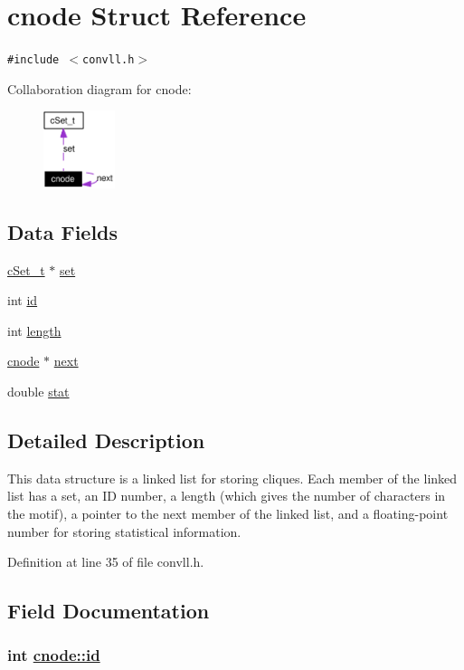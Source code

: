 \hypertarget{structcnode}{
\section{cnode Struct Reference}
\label{structcnode}
}
{\tt \#include $<$convll.h$>$}

Collaboration diagram for cnode:\begin{figure}[H]
\begin{center}
\leavevmode
\includegraphics[width=59pt]{structcnode__coll__graph}
\end{center}
\end{figure}
\subsection*{Data Fields}
\begin{CompactItemize}
\item 
\hyperlink{structcSet__t}{c\-Set\_\-t} $\ast$ \hyperlink{structcnode_o0}{set}
\item 
int \hyperlink{structcnode_o1}{id}
\item 
int \hyperlink{structcnode_o2}{length}
\item 
\hyperlink{structcnode}{cnode} $\ast$ \hyperlink{structcnode_o3}{next}
\item 
double \hyperlink{structcnode_o4}{stat}
\end{CompactItemize}


\subsection*{Detailed Description}
This data structure is a linked list for storing cliques. Each member of the linked list has a set, an ID number, a length (which gives the number of characters in the motif), a pointer to the next member of the linked list, and a floating-point number for storing statistical information.



Definition at line 35 of file convll.h.

\subsection*{Field Documentation}
\hypertarget{structcnode_o1}{
\subsubsection[id]{\setlength{\rightskip}{0pt plus 5cm}int \hyperlink{structcnode_o1}{cnode::id}}}
\label{structcnode_o1}


